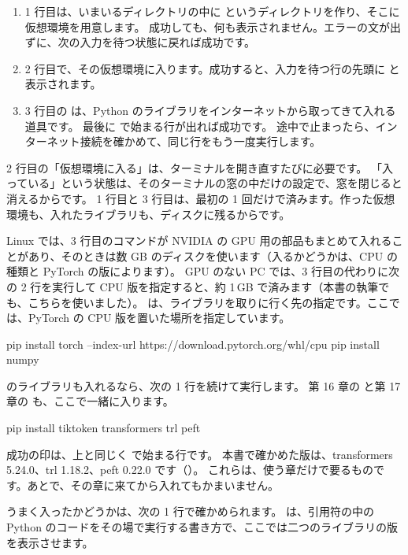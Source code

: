 \begin{enumerate}[leftmargin=2em,itemsep=0pt]
\item 1 行目は、いまいるディレクトリの中に  というディレクトリを作り、そこに仮想環境を用意します。
  成功しても、何も表示されません。エラーの文が出ずに、次の入力を待つ状態に戻れば成功です。
\item 2 行目で、その仮想環境に入ります。成功すると、入力を待つ行の先頭に  と表示されます。
\item 3 行目の  は、Python のライブラリをインターネットから取ってきて入れる道具です。
  最後に  で始まる行が出れば成功です。
  途中で止まったら、インターネット接続を確かめて、同じ行をもう一度実行します。
\end{enumerate}

2 行目の「仮想環境に入る」は、ターミナルを開き直すたびに必要です。
「入っている」という状態は、そのターミナルの窓の中だけの設定で、窓を閉じると消えるからです。
1 行目と 3 行目は、最初の 1 回だけで済みます。作った仮想環境も、入れたライブラリも、ディスクに残るからです。

Linux では、3 行目のコマンドが NVIDIA の GPU 用の部品もまとめて入れることがあり、そのときは数 GB のディスクを使います（入るかどうかは、CPU の種類と PyTorch の版によります）。
GPU のない PC では、3 行目の代わりに次の 2 行を実行して CPU 版を指定すると、約 1\,GB で済みます（本書の執筆でも、こちらを使いました）。
 は、ライブラリを取りに行く先の指定です。ここでは、PyTorch の CPU 版を置いた場所を指定しています。

\begin{textcode}
pip install torch --index-url https://download.pytorch.org/whl/cpu
pip install numpy
\end{textcode}

のライブラリも入れるなら、次の 1 行を続けて実行します。
第 16 章の  と第 17 章の  も、ここで一緒に入ります。

\begin{textcode}
pip install tiktoken transformers trl peft
\end{textcode}

成功の印は、上と同じく  で始まる行です。
本書で確かめた版は、transformers 5.24.0、trl 1.18.2、peft 0.22.0 です（）。
これらは、使う章だけで要るものです。あとで、その章に来てから入れてもかまいません。

うまく入ったかどうかは、次の 1 行で確かめられます。
 は、引用符の中の Python のコードをその場で実行する書き方で、ここでは二つのライブラリの版を表示させます。

